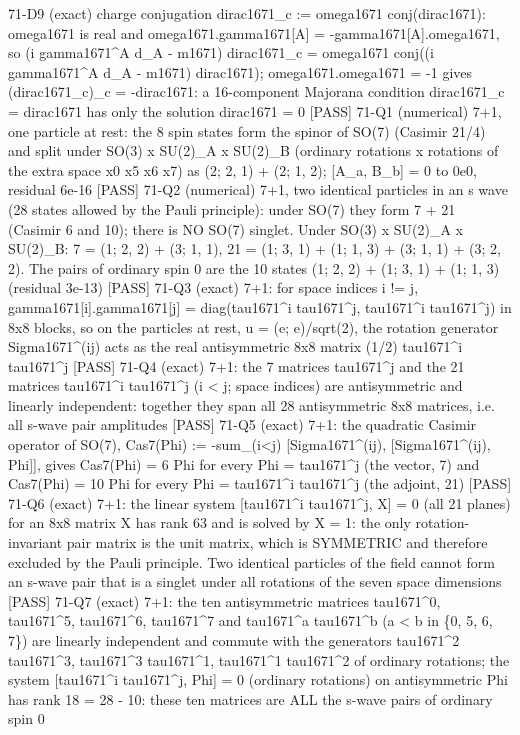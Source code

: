 \documentclass[
  10pt,
]{article}
\newenvironment{Shaded}{}{}
\newcommand{\NormalTok}[1]{#1}
\begin{document}
\begin{Shaded}
\begin{Highlighting}[]
\NormalTok{[PASS] 71{-}D9  (exact) charge conjugation dirac1671\_c := omega1671 conj(dirac1671): omega1671 is real and omega1671.gamma1671[A] = {-}gamma1671[A].omega1671, so (i gamma1671\^{}A d\_A {-} m1671) dirac1671\_c = omega1671 conj((i gamma1671\^{}A d\_A {-} m1671) dirac1671); omega1671.omega1671 = {-}1 gives (dirac1671\_c)\_c = {-}dirac1671: a 16{-}component Majorana condition dirac1671\_c = dirac1671 has only the solution dirac1671 = 0}
\NormalTok{[PASS] 71{-}Q1  (numerical) 7+1, one particle at rest: the 8 spin states form the spinor of SO(7) (Casimir 21/4) and split under SO(3) x SU(2)\_A x SU(2)\_B (ordinary rotations x rotations of the extra space x0 x5 x6 x7) as (2; 2, 1) + (2; 1, 2); [A\_a, B\_b] = 0 to 0e0, residual 6e{-}16}
\NormalTok{[PASS] 71{-}Q2  (numerical) 7+1, two identical particles in an s wave (28 states allowed by the Pauli principle): under SO(7) they form 7 + 21 (Casimir 6 and 10); there is NO SO(7) singlet.  Under SO(3) x SU(2)\_A x SU(2)\_B:  7 = (1; 2, 2) + (3; 1, 1),  21 = (1; 3, 1) + (1; 1, 3) + (3; 1, 1) + (3; 2, 2).  The pairs of ordinary spin 0 are the 10 states (1; 2, 2) + (1; 3, 1) + (1; 1, 3) (residual 3e{-}13)}
\NormalTok{[PASS] 71{-}Q3  (exact) 7+1: for space indices i != j, gamma1671[i].gamma1671[j] = diag(tau1671\^{}i tau1671\^{}j, tau1671\^{}i tau1671\^{}j) in 8x8 blocks, so on the particles at rest, u = (e; e)/sqrt(2), the rotation generator Sigma1671\^{}(ij) acts as the real antisymmetric 8x8 matrix (1/2) tau1671\^{}i tau1671\^{}j}
\NormalTok{[PASS] 71{-}Q4  (exact) 7+1: the 7 matrices tau1671\^{}j and the 21 matrices tau1671\^{}i tau1671\^{}j (i \textless{} j; space indices) are antisymmetric and linearly independent: together they span all 28 antisymmetric 8x8 matrices, i.e. all s{-}wave pair amplitudes}
\NormalTok{[PASS] 71{-}Q5  (exact) 7+1: the quadratic Casimir operator of SO(7), Cas7(Phi) := {-}sum\_(i\textless{}j) [Sigma1671\^{}(ij), [Sigma1671\^{}(ij), Phi]], gives Cas7(Phi) = 6 Phi for every Phi = tau1671\^{}j (the vector, 7) and Cas7(Phi) = 10 Phi for every Phi = tau1671\^{}i tau1671\^{}j (the adjoint, 21)}
\NormalTok{[PASS] 71{-}Q6  (exact) 7+1: the linear system [tau1671\^{}i tau1671\^{}j, X] = 0 (all 21 planes) for an 8x8 matrix X has rank 63 and is solved by X = 1: the only rotation{-}invariant pair matrix is the unit matrix, which is SYMMETRIC and therefore excluded by the Pauli principle.  Two identical particles of the field cannot form an s{-}wave pair that is a singlet under all rotations of the seven space dimensions}
\NormalTok{[PASS] 71{-}Q7  (exact) 7+1: the ten antisymmetric matrices tau1671\^{}0, tau1671\^{}5, tau1671\^{}6, tau1671\^{}7 and tau1671\^{}a tau1671\^{}b (a \textless{} b in \{0, 5, 6, 7\}) are linearly independent and commute with the generators tau1671\^{}2 tau1671\^{}3, tau1671\^{}3 tau1671\^{}1, tau1671\^{}1 tau1671\^{}2 of ordinary rotations; the system [tau1671\^{}i tau1671\^{}j, Phi] = 0 (ordinary rotations) on antisymmetric Phi has rank 18 = 28 {-} 10: these ten matrices are ALL the s{-}wave pairs of ordinary spin 0}

\end{Highlighting}
\end{Shaded}
\end{document}
